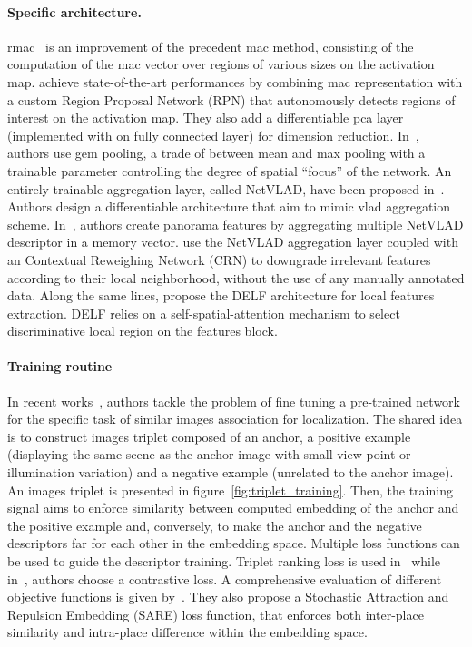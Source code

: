 \paragraph{Specific architecture.} \label{subsubsec:cnn_aggregation}
\ac{rmac}~\citep{Tolias2016} is an improvement of the precedent \ac{mac} method, consisting of the computation of the \ac{mac} vector over regions of various sizes on the activation map. \citet{Gordo2017} achieve state-of-the-art performances by combining \ac{mac} representation with a custom Region Proposal Network (RPN) that autonomously detects regions of interest on the activation map. They also add a differentiable \ac{pca} layer (implemented with on fully connected layer) for dimension reduction. In~\citep{Radenovic2017}, authors use \ac{gem} pooling, a trade of between mean and max pooling with a trainable parameter controlling the degree of spatial ``focus'' of the network. An entirely trainable aggregation layer, called NetVLAD, have been proposed in~\citep{Arandjelovic2017}. Authors design a differentiable architecture that aim to mimic \ac{vlad} aggregation scheme. In~\citep{Iscen2017}, authors create panorama features by aggregating multiple NetVLAD descriptor in a memory vector. \citet{Kim2017a} use the NetVLAD aggregation layer coupled with an Contextual Reweighing Network (CRN) to downgrade irrelevant features according to their local neighborhood, without the use of any manually annotated data. Along the same lines, \citet{Noh2017} propose the DELF architecture for local features extraction. DELF relies on a self-spatial-attention mechanism to select discriminative local region on the features block. 


\paragraph{Training routine}
In recent works~\citep{Arandjelovic2017,Radenovic2016, Gordo2016}, authors tackle the problem of fine tuning a pre-trained network for the specific task of similar images association for localization. The shared idea is to construct images triplet composed of an anchor, a positive example (displaying the same scene as the anchor image with small view point or illumination variation) and a negative example (unrelated to the anchor image). An images triplet is presented in figure~\ref{fig:triplet_training}. Then, the training signal aims to enforce similarity between computed embedding of the anchor and the positive example and, conversely, to make the anchor and the negative descriptors far for each other in the embedding space. Multiple loss functions can be used to guide the descriptor training. Triplet ranking loss is used in~\citep{Arandjelovic2017,Gordo2017} while in~\citep{Radenovic2016,Noh2017}, authors choose a contrastive loss. A comprehensive evaluation of different objective functions is given by~\citet{Liu2018}. They also propose a Stochastic Attraction and Repulsion Embedding (SARE) loss function, that enforces both inter-place similarity and intra-place difference within the embedding space. 

